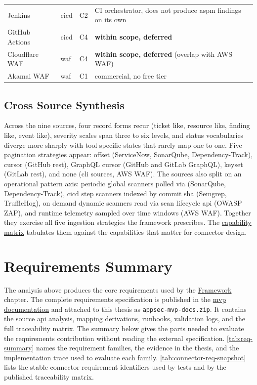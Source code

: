 \begin{center}
\begin{minipage}{\textwidth}
\begin{tabularx}{\linewidth}{l l l X}
Jenkins           & \gls{cicd}            & C2     & CI orchestrator, does not produce \gls{aspm} findings on its own \\
GitHub Actions    & \gls{cicd}            & C4     & \textbf{within scope, deferred} \\
Cloudflare WAF    & \gls{waf}           & C4     & \textbf{within scope, deferred} (overlap with AWS WAF) \\
Akamai WAF        & \gls{waf}           & C1     & commercial, no free tier \\
\bottomrule
\end{tabularx}
\end{minipage}
\end{center}

\subsection{Cross Source Synthesis}
\label{sec:cross-source-synthesis}

Across the nine sources, four record forms recur (ticket like, resource like, finding like, event like), severity scales span three to six levels, and status vocabularies diverge more sharply with tool specific states that rarely map one to one. Five pagination strategies appear: offset (ServiceNow, SonarQube, Dependency-Track), cursor (GitHub \gls{rest}), GraphQL cursor (GitHub and GitLab GraphQL), keyset (GitLab \gls{rest}), and none (\gls{cli} sources, AWS WAF). The sources also split on an operational pattern axis: periodic global scanners polled via  (SonarQube, Dependency-Track), \gls{cicd} step scanners indexed by commit \gls{sha} (Semgrep, TruffleHog), on demand dynamic scanners read via scan lifecycle \gls{api} (OWASP ZAP), and runtime telemetry sampled over time windows (AWS WAF). Together they exercise all five ingestion strategies the framework prescribes. The \href{https://vkraus.github.io/appsec-mvp/platform/reference/source-capability-matrix/}{capability matrix} tabulates them against the capabilities that matter for connector design.

\section{Requirements Summary}
\label{sec:req-summary}

The analysis above produces the core requirements used by the \hyperref[ch:framework]{Framework} chapter. The complete requirements specification is published in the \href{https://vkraus.github.io/appsec-mvp/}{\gls{mvp} documentation} and attached to this thesis as \texttt{appsec-mvp-docs.zip}. It contains the source \gls{api} analysis, mapping derivations, runbooks, validation logs, and the full traceability matrix. The summary below gives the parts needed to evaluate the requirements contribution without reading the external specification. \autoref{tab:req-summary} names the requirement families, the evidence in the thesis, and the implementation trace used to evaluate each family. \autoref{tab:connector-req-snapshot} lists the stable connector requirement identifiers used by tests and by the published traceability matrix.

